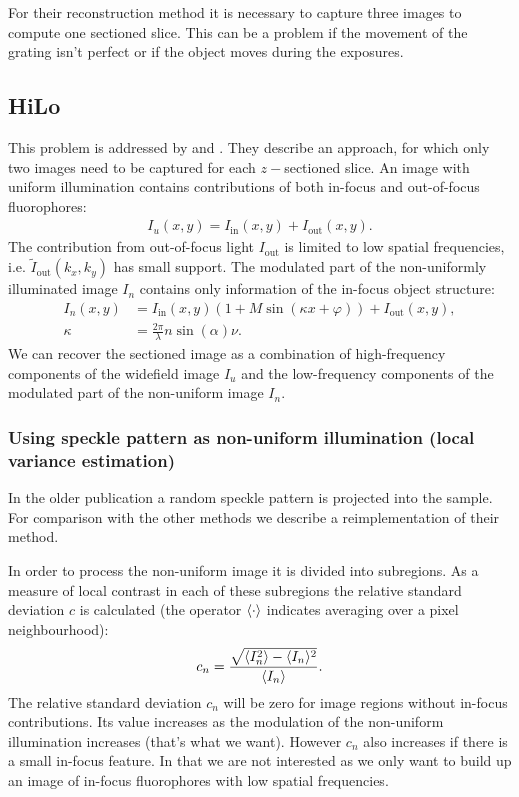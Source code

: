 For their reconstruction method it is necessary to capture three
images to compute one sectioned slice. This can be a problem if the
movement of the grating isn't perfect or if the object moves during
the exposures.
\subsection{HiLo}
This problem is addressed by \citet{2008Lim} and
\citet{2009Santos}. They describe an approach, for which only two
images need to be captured for each $z-$sectioned slice.  An image
with uniform illumination contains contributions of both in-focus and
out-of-focus fluorophores:
\begin{align}
\label{eqn:Iu}
  I_u(x,y)=I_\textrm{in}(x,y)+I_\textrm{out}(x,y).
\end{align}
The contribution from out-of-focus light $I_\textrm{out}$ is limited
to low spatial frequencies, i.e. $\tilde I_\textrm{out}(k_x,k_y)$ has
small support. The modulated part of the non-uniformly illuminated
image $I_n$ contains only information of the in-focus object
structure:
\begin{align}
\label{eqn:In}
  I_n(x,y)&=I_\textrm{in}(x,y)(1+M
  \sin(\kappa x+\varphi))+I_\textrm{out}(x,y),\\
  \kappa&=\frac{2\pi}{\lambda}n\sin(\alpha)\nu.
\end{align}
We can recover the sectioned image as a combination of high-frequency
components of the widefield image $I_u$ and the low-frequency
components of the modulated part of the non-uniform image $I_n$.
\subsubsection{Using speckle pattern as non-uniform illumination (local variance estimation)}
In the older publication \citep{2008Lim} a random speckle pattern is
projected into the sample. For comparison with the other methods we
describe a reimplementation of their method.

In order to process the non-uniform image it is divided into
subregions.  As a measure of local contrast in each of these
subregions the relative standard deviation $c$ is calculated (the
operator $\langle \cdot \rangle$ indicates averaging over a pixel
neighbourhood):
\begin{align}
  c_n=\frac{\sqrt{\langle I_n^2 \rangle-\langle I_n \rangle^2}}{\langle I_n \rangle}.
\end{align}
The relative standard deviation $c_n$ will be zero for image regions
without in-focus contributions. Its value increases as the modulation
of the non-uniform illumination increases (that's what we
want). However $c_n$ also increases if there is a small in-focus
feature. In that we are not interested as we only want to build up an
image of in-focus fluorophores with low spatial frequencies. 

